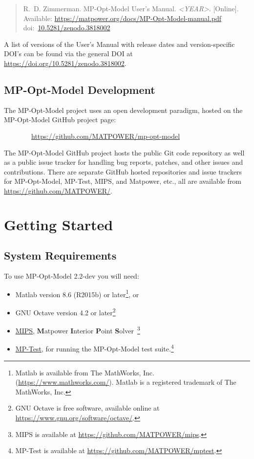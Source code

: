 \documentclass[12pt]{article}
\newcommand{\matlab}[0]{{\sc Matlab}}
\newcommand{\matpower}[0]{{\sc Matpower}}
\newcommand{\mptest}[0]{{MP-Test}}
\newcommand{\mptesturl}[0]{https://github.com/MATPOWER/mptest}
\newcommand{\mptestlink}[0]{\href{\mptesturl}{\mptest{}}}
\newcommand{\mips}[0]{{MIPS}}
\newcommand{\mipsurl}[0]{https://github.com/MATPOWER/mips}
\newcommand{\mipslink}[0]{\href{\mipsurl}{\mips{}}}
\newcommand{\mipsname}[0]{{{\bf M}{\sc atpower} \textbf{I}nterior \textbf{P}oint \textbf{S}olver}}
\newcommand{\mpom}[0]{\mbox{MP-Opt-Model}}
\newcommand{\mpomurl}[0]{https://github.com/MATPOWER/mp-opt-model}
\newcommand{\mpomname}[0]{\mpom{}}
\newcommand{\mpomver}[0]{2.2-dev}
\newcommand{\doi}[1]{doi:~\href{https://doi.org/#1}{#1}}
\numberwithin{equation}{section}
\numberwithin{table}{section}
\numberwithin{figure}{section}
\begin{document}
\begin{quote}
\footnotesize
R.~D. Zimmerman. \mpomname{} User's Manual. \emph{\textless{}YEAR\textgreater{}}.
[Online]. Available: \url{https://matpower.org/docs/MP-Opt-Model-manual.pdf}\\
\doi{10.5281/zenodo.3818002}
\end{quote}
A list of versions of the User's Manual with release dates and
version-specific DOI's can be found via the general DOI at
\url{https://doi.org/10.5281/zenodo.3818002}.

\subsection{\mpom{} Development}
\label{sec:development}

The \mpom{} project uses an open development paradigm, hosted on the \mpom{} GitHub project page:

\bigskip

~~~~~~~~\url{\mpomurl}

\bigskip

The \mpom{} GitHub project hosts the public Git code repository as well as a public issue tracker for handling bug reports, patches, and other issues and contributions. There are separate GitHub hosted repositories and issue trackers for \mpom{}, \mptest{}, \mips{}, and \matpower{}, etc., all are available from \url{https://github.com/MATPOWER/}.


\clearpage
\section{Getting Started}

\subsection{System Requirements}
\label{sec:sysreq}
To use \mpom{} \mpomver{} you will need:
\begin{itemize}
\item \matlab{}\textsuperscript{\tiny \textregistered} version 8.6 (R2015b) or later\footnote{\matlab{} is available from The MathWorks, Inc. (\url{https://www.mathworks.com/}). \matlab{} is a registered trademark of The MathWorks, Inc.}, or
\item GNU Octave version 4.2 or later\footnote{GNU Octave \cite{octave} is free software, available online at \url{https://www.gnu.org/software/octave/}.}
\item \mipslink{}, \mipsname{}~\cite{wang2007a, mips_manual}\footnote{\mips{} is available at \url{\mipsurl}.}
\item \mptestlink{}, for running the \mpom{} test suite.\footnote{\mptest{} is available at \url{\mptesturl}.}
\end{itemize}
\end{document}
